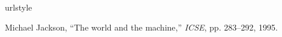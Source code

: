\begin{thebibliography}{5}
\providecommand{\natexlab}[1]{#1}
\providecommand{\url}[1]{{#1}}
\providecommand{\urlprefix}{URL }
\expandafter\ifx\csname urlstyle\endcsname\relax
  \providecommand{\doi}[1]{DOI~\discretionary{}{}{}#1}\else
  \providecommand{\doi}{DOI~\discretionary{}{}{}\begingroup
  \urlstyle{rm}\Url}\fi
\providecommand{\eprint}[2][]{\url{#2}}

Michael Jackson, ``{The world and the machine},'' {\em ICSE}, pp. 283--292, 1995.




\end{thebibliography}





